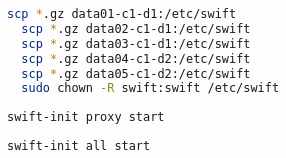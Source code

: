 \begin{lstlisting}[label=scp, language=Bash, caption=Dateien Verteilen]
  scp *.gz data01-c1-d1:/etc/swift
  scp *.gz data02-c1-d1:/etc/swift  
  scp *.gz data03-c1-d1:/etc/swift
  scp *.gz data04-c1-d2:/etc/swift
  scp *.gz data05-c1-d2:/etc/swift
  sudo chown -R swift:swift /etc/swift
\end{lstlisting}

\begin{lstlisting}[label=startproxy, language=Bash, caption=Proxy Dienst starten]
swift-init proxy start
\end{lstlisting}

\begin{lstlisting}[label=start_datanode, language=Bash, caption=Auf allen Nodes die Dienste starten]
swift-init all start
\end{lstlisting}